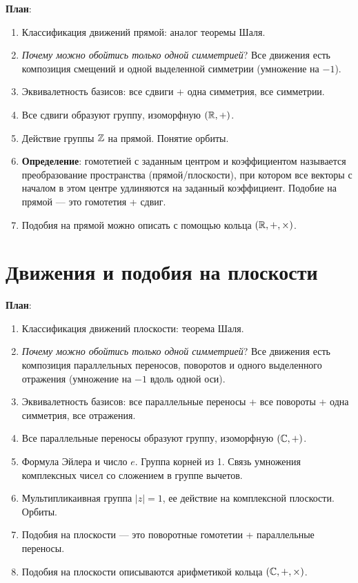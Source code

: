 \textbf{План}:
\begin{enumerate}
\item Классификация движений прямой: аналог теоремы Шаля.
\item \textit{Почему можно обойтись только одной симметрией}? Все движения есть композиция смещений и одной выделенной симметрии (умножение на $-1$).
\item Эквивалетность базисов: все сдвиги + одна симметрия, все симметрии.
\item Все сдвиги образуют группу, изоморфную $(\mathbb R,+)$.
\item Действие группы $\mathbb Z$ на прямой. Понятие орбиты.
\item \textbf{Определение}: гомотетией с заданным центром и коэффициентом называется преобразование пространства (прямой/плоскости), при котором все векторы с началом в этом центре удлиняются на заданный коэффициент. Подобие на прямой --- это гомотетия + сдвиг.
\item Подобия на прямой можно описать с помощью кольца $(\mathbb R,+,\times)$.
\end{enumerate}







\section{Движения и подобия на плоскости}


\textbf{План}:
\begin{enumerate}
\item Классификация движений плоскости: теорема Шаля.
\item \textit{Почему можно обойтись только одной симметрией}? Все движения есть композиция параллельных переносов, поворотов и одного выделенного отражения (умножение на $-1$ вдоль одной оси).
\item Эквивалетность базисов: все параллельные переносы + все повороты + одна симметрия, все отражения.
\item Все параллельные переносы образуют группу, изоморфную $(\mathbb C,+)$.
\item Формула Эйлера и число $e$. Группа корней из 1. Связь умножения комплексных чисел со сложением в группе вычетов.
\item Мультипликаивная группа $|z|=1$, ее действие на комплексной плоскости. Орбиты.
\item Подобия на плоскости --- это поворотные гомотетии + параллельные переносы.
\item Подобия на плоскости описываются арифметикой кольца $(\mathbb C,+,\times)$.
\end{enumerate}

